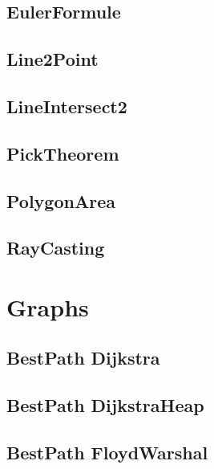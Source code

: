 \subsection{ EulerFormule}
\raggedbottom
\hrulefill
\subsection{ Line2Point}
\raggedbottom
\hrulefill
\subsection{ LineIntersect2}
\raggedbottom
\hrulefill
\subsection{ PickTheorem}
\raggedbottom
\hrulefill
\subsection{ PolygonArea}
\raggedbottom
\hrulefill
\subsection{ RayCasting}
\raggedbottom
\hrulefill

\section{Graphs}
\subsection{BestPath Dijkstra}
\raggedbottom
\hrulefill
\subsection{BestPath DijkstraHeap}
\raggedbottom
\hrulefill
\subsection{BestPath FloydWarshal}
\raggedbottom
\hrulefill
